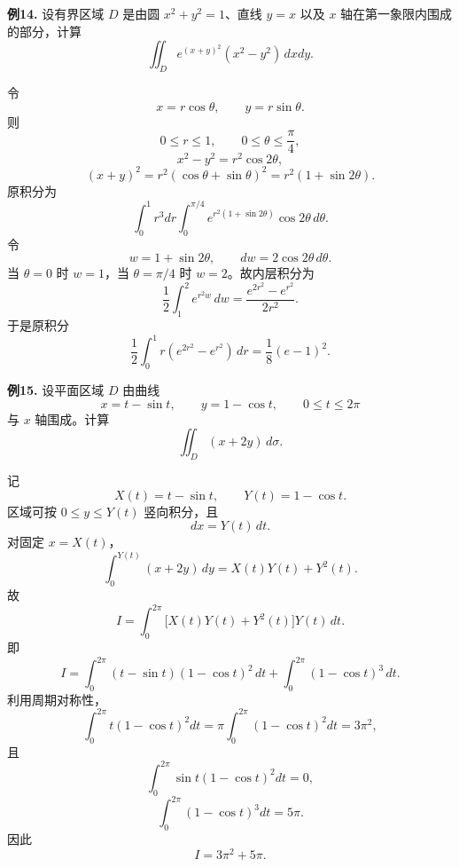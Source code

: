 \begin{problemblock}
\textbf{例14.} 设有界区域 \(D\) 是由圆 \(x^2+y^2=1\)、直线 \(y=x\) 以及 \(x\) 轴在第一象限内围成的部分，计算
\[
\iint_D e^{(x+y)^2}(x^2-y^2)\,dxdy.
\]
\end{problemblock}
\begin{solutionblock}
令
\[
x=r\cos\theta,\qquad y=r\sin\theta.
\]
则
\[
0\le r\le1,\qquad 0\le\theta\le\frac\pi4,
\]
\[
x^2-y^2=r^2\cos2\theta,
\]
\[
(x+y)^2=r^2(\cos\theta+\sin\theta)^2=r^2(1+\sin2\theta).
\]
原积分为
\[
\int_0^1r^3dr\int_0^{\pi/4}
e^{r^2(1+\sin2\theta)}\cos2\theta\,d\theta.
\]
令
\[
w=1+\sin2\theta,\qquad dw=2\cos2\theta\,d\theta.
\]
当 \(\theta=0\) 时 \(w=1\)，当 \(\theta=\pi/4\) 时 \(w=2\)。故内层积分为
\[
\frac12\int_1^2e^{r^2w}\,dw
=\frac{e^{2r^2}-e^{r^2}}{2r^2}.
\]
于是原积分
\[
\frac12\int_0^1r(e^{2r^2}-e^{r^2})\,dr
=\frac18(e-1)^2.
\]
\end{solutionblock}

\begin{problemblock}
\textbf{例15.} 设平面区域 \(D\) 由曲线
\[
x=t-\sin t,\qquad y=1-\cos t,\qquad 0\le t\le2\pi
\]
与 \(x\) 轴围成。计算
\[
\iint_D(x+2y)\,d\sigma.
\]
\end{problemblock}
\begin{solutionblock}
记
\[
X(t)=t-\sin t,\qquad Y(t)=1-\cos t.
\]
区域可按 \(0\le y\le Y(t)\) 竖向积分，且
\[
dx=Y(t)\,dt.
\]
对固定 \(x=X(t)\)，
\[
\int_0^{Y(t)}(x+2y)\,dy
=X(t)Y(t)+Y^2(t).
\]
故
\[
I=\int_0^{2\pi}\bigl[X(t)Y(t)+Y^2(t)\bigr]Y(t)\,dt.
\]
即
\[
I=\int_0^{2\pi}(t-\sin t)(1-\cos t)^2\,dt
+\int_0^{2\pi}(1-\cos t)^3\,dt.
\]
利用周期对称性，
\[
\int_0^{2\pi}t(1-\cos t)^2dt
=\pi\int_0^{2\pi}(1-\cos t)^2dt=3\pi^2,
\]
且
\[
\int_0^{2\pi}\sin t(1-\cos t)^2dt=0,
\]
\[
\int_0^{2\pi}(1-\cos t)^3dt=5\pi.
\]
因此
\[
I=3\pi^2+5\pi.
\]
\end{solutionblock}

